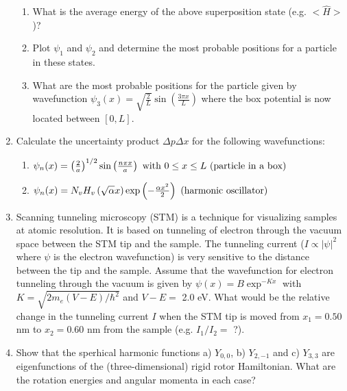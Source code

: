 \begin{enumerate}
\begin{enumerate}
\item What is the average energy of the above superposition state (e.g. $<\hat{H}>$)?
\item Plot $\psi_1$ and $\psi_2$ and determine the most probable positions for a particle in these states.
\item What are the most probable positions for the particle given by wavefunction
$\psi_3(x) = \sqrt{\frac{2}{L}}\sin\left(\frac{3\pi x}{L}\right)$ where the box potential is now located between $\left[0,L\right]$.
\end{enumerate}


\item Calculate the uncertainty product $\Delta p\Delta x$ for the following wavefunctions:

\begin{enumerate}
\item $\psi_n(x) = \left(\frac{2}{a}\right)^{1/2}\sin\left(\frac{n\pi x}{a}\right)\textnormal{ with }0\le x\le L\textnormal{ (particle in a box)}$
\item $\psi_n(x) = N_vH_v\left(\sqrt{\alpha}x\right)\exp\left(-\frac{\alpha x^2}{2}\right)\textnormal{ (harmonic oscillator)}$
\end{enumerate}


\item Scanning tunneling microscopy (STM) is a technique for visualizing samples at atomic resolution. It is based on tunneling of electron through the vacuum space between the STM tip and the sample. The tunneling current ($I\propto \left|\psi\right|^2$ where $\psi$ is the electron wavefunction) is very sensitive to the distance between the tip and the sample. Assume that the wavefunction for electron tunneling through the vacuum is given by $\psi(x) = B\exp^{-Kx}$ with $K = \sqrt{2m_e(V - E)/\hbar^2}$ and $V - E =$ 2.0 eV. What would be the relative change in the tunneling current $I$ when the STM tip is moved from $x_1 = 0.50$ nm to $x_2 = 0.60$ nm from the sample (e.g. $I_1 / I_2 =$ ?).


\item Show that the sperhical harmonic functions a) $Y_{0,0}$, b) $Y_{2,-1}$ and c) $Y_{3,3}$ are eigenfunctions of the (three-dimensional) rigid rotor Hamiltonian. What are the rotation energies and angular momenta in each case?


\end{enumerate}
